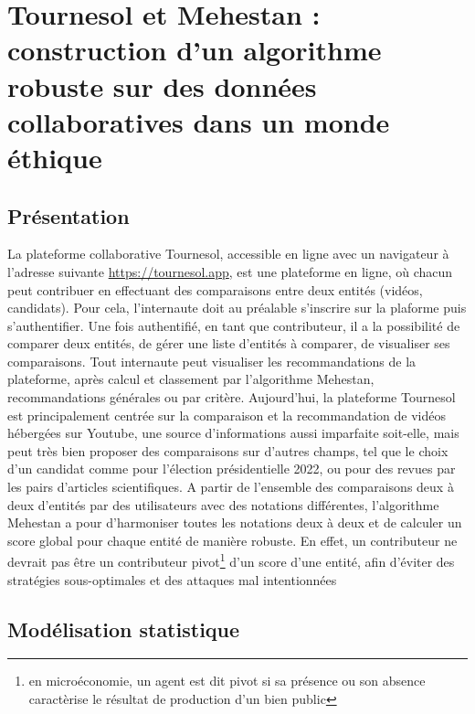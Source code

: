 \section{Tournesol et Mehestan : construction d'un algorithme robuste sur des données collaboratives dans un monde éthique}

\subsection{Présentation}

La plateforme collaborative Tournesol, accessible en ligne avec un navigateur à l'adresse suivante \href{https://tournesol.app}{https://tournesol.app}, est une plateforme en ligne, où chacun peut contribuer en effectuant des comparaisons entre deux entités (vidéos, candidats). Pour cela, l'internaute doit au préalable s'inscrire sur la plaforme puis s'authentifier. Une fois authentifié, en tant que contributeur, il a la possibilité de comparer deux entités, de gérer une liste d'entités à comparer, de visualiser ses comparaisons. Tout internaute peut visualiser les recommandations de la plateforme, après calcul et classement par l'algorithme Mehestan, recommandations générales ou par critère. Aujourd'hui, la plateforme Tournesol est principalement centrée sur la comparaison et la recommandation de vidéos hébergées sur Youtube, une source d'informations aussi imparfaite soit-elle, mais peut très bien proposer des comparaisons sur d'autres champs, tel que le choix d'un candidat comme pour l'élection présidentielle 2022, ou pour des revues par les pairs d'articles scientifiques.
A partir de l'ensemble des comparaisons deux à deux d'entités par des utilisateurs avec des notations différentes, l'algorithme Mehestan a pour d'harmoniser toutes les notations deux à deux et de calculer un score global pour chaque entité de manière robuste. En effet, un contributeur ne devrait pas être un contributeur pivot\footnote{en microéconomie, un agent est dit pivot si sa présence ou son absence caractèrise le résultat de production d'un bien public } d'un score d'une entité, afin d'éviter des stratégies sous-optimales et des attaques mal intentionnées


\subsection{Modélisation statistique}
\pagebreak

